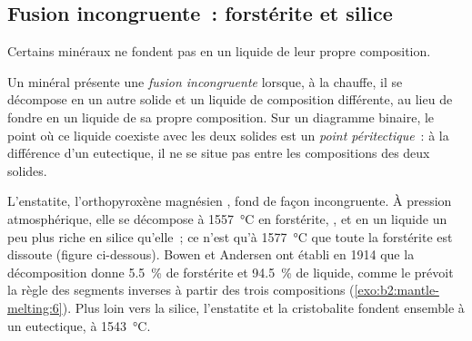 \subsection*{Fusion incongruente~: forstérite et silice}

Certains minéraux ne fondent pas en un liquide de leur propre composition.

\begin{definition}\label{def:b2:mantle-melting:peritectic}
Un minéral présente une \emph{fusion incongruente} lorsque, à la chauffe,
il se décompose en un autre solide et un liquide de composition différente,
au lieu de fondre en un liquide de sa propre composition. Sur un diagramme binaire,
le point où ce liquide coexiste avec les deux solides est un
\emph{point péritectique}~: à la différence d'un eutectique,
il ne se situe pas entre les compositions des deux solides.
\end{definition}

L'enstatite, l'orthopyroxène magnésien , fond de façon incongruente. À
pression atmosphérique, elle se décompose à \qty{1557}{\celsius} en forstérite,
, et en un liquide un peu plus riche en silice qu'elle~; ce n'est qu'à
\qty{1577}{\celsius} que toute la forstérite est dissoute (figure ci-dessous). Bowen
et Andersen ont établi en 1914 que la décomposition donne \qty{5.5}{\percent} de
forstérite et \qty{94.5}{\percent} de liquide, comme le prévoit la règle des segments
inverses à partir des trois compositions (\cref{exo:b2:mantle-melting:6}). Plus loin vers la silice, l'enstatite et la
cristobalite fondent ensemble à un eutectique, à \qty{1543}{\celsius}.

